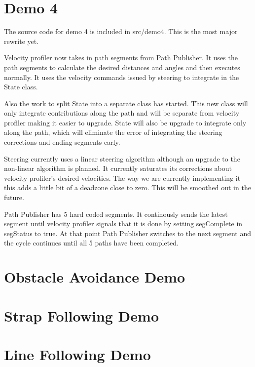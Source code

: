 \section{Demo 4}
The source code for demo 4 is included in src/demo4.  This is the most
major rewrite yet.

Velocity profiler now takes in path segments from Path Publisher.  It
uses the path segments to calculate the desired distances and angles
and then executes normally. It uses the velocity commands issued by
steering to integrate in the State class.

Also the work to split State into a separate class has started.  This
new class will only integrate contributions along the path and will be
separate from velocity profiler making it easier to upgrade.  State
will also be upgrade to integrate only along the path, which will
eliminate the error of integrating the steering corrections and ending
segments early.

Steering currently uses a linear steering algorithm although an
upgrade to the non-linear algorithm is planned.  It currently
saturates its corrections about velocity profiler's desired
velocities.  The way we are currently implementing it this adds a
little bit of a deadzone close to zero.  This will be smoothed out in
the future.

Path Publisher has 5 hard coded segments.  It continously sends the
latest segment until velocity profiler signals that it is done by
setting segComplete in segStatus to true.  At that point Path
Publisher switches to the next segment and the cycle continues until
all 5 paths have been completed.


\section{Obstacle Avoidance Demo}

\section{Strap Following Demo}

\section{Line Following Demo}
